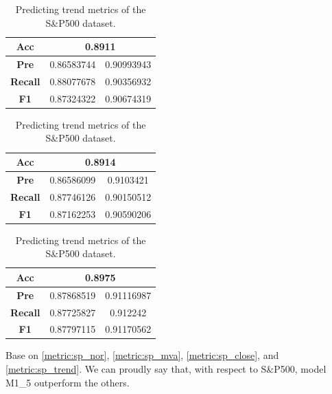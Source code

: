 \begin{table}[H]
	\centering
	\begin{minipage}{0.45\textwidth}
		\centering
		\begin{tabular}{|c|c|c|}
			\hline
			\textbf{Acc}    & \multicolumn{2}{c|}{0.8911} \\
			\hline
			\textbf{Pre}    & 0.86583744                 & 0.90993943 \\
			\hline
			\textbf{Recall} & 0.88077678                 & 0.90356932 \\
			\hline
			\textbf{F1}     & 0.87324322                 & 0.90674319 \\
			\hline
		\end{tabular}
	\end{minipage}
	\begin{minipage}{0.45\textwidth}
		\centering
		\begin{tabular}{|c|c|c|}
			\hline
			\textbf{Acc}    & \multicolumn{2}{c|}{0.8914} \\
			\hline
			\textbf{Pre}    & 0.86586099                 & 0.9103421  \\
			\hline
			\textbf{Recall} & 0.87746126                 & 0.90150512 \\
			\hline
			\textbf{F1}     & 0.87162253                 & 0.90590206 \\
			\hline
		\end{tabular}
	\end{minipage}
	\begin{minipage}{0.45\textwidth}
		\centering
		\begin{tabular}{|c|c|c|}
			\hline
			\textbf{Acc}    & \multicolumn{2}{c|}{0.8975} \\
			\hline
			\textbf{Pre}    & 0.87868519                 & 0.91116987 \\
			\hline
			\textbf{Recall} & 0.87725827                 & 0.912242   \\
			\hline
			\textbf{F1}     & 0.87797115                 & 0.91170562 \\
			\hline
		\end{tabular}
	\end{minipage}
	\caption{Predicting trend metrics of the S\&P500 dataset.}
	\label{metric:sp_trend}
\end{table}

Base on \autoref{metric:sp_nor}, \autoref{metric:sp_mva},
\autoref{metric:sp_close}, and \autoref{metric:sp_trend}. We can proudly say
that, with respect to S\&P500, model M1\_5 outperform the others.

